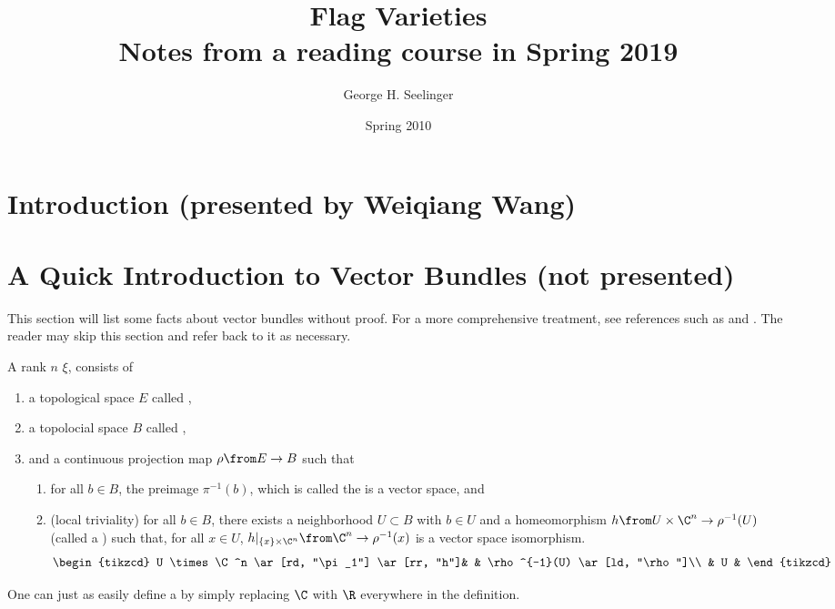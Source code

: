 \documentclass[11pt,leqno,oneside]{amsbook}
\title[Flag Varieties]{Flag Varieties \\ Notes
  from a reading course in Spring 2019}
\author{George H. Seelinger}
\date{Spring 2010}
\numberwithin{thm}{section}
\begin{document}
\maketitle
\section{Introduction (presented by Weiqiang Wang)}
\section{A Quick Introduction to Vector Bundles (not presented)}
This section will list some facts about vector bundles without
proof. For a more comprehensive treatment, see references such as
\cite{bott-tu} and \cite{milnor-stasheff}. The reader may skip this
section and refer back to it as necessary. 
\begin{defn}\label{defn-of-vector-bundle}
  A rank \(n\)  \(\xi\), consists of
  \begin{enumerate}
  \item a topological space \(E\) called ,
  \item a topolocial space \(B\) called ,
  \item and a continuous projection map \(\rho \from E \to B\) such that
    \begin{enumerate}
    \item for all \(b \in B\), the preimage \(\pi^{-1}(b)\), which is
      called the  is a vector space, and
    \item (local triviality) for all \(b \in B\), there exists a neighborhood \(U \subset
      B\) with \(b \in U\) and a homeomorphism \(h \from U \times \C^n
      \to \rho^{-1}(U)\) (called a ) such
      that, for all \(x \in U\), \(h|_{\{x\} 
        \times \C^n} \from \C^n \to \rho^{-1}(x)\) is a vector space
      isomorphism. \[
        \begin{tikzcd}
          U \times \C^n \ar[rd, "\pi_1"] \ar[rr, "h"]& & \rho^{-1}(U)
          \ar[ld, "\rho"]\\
          & U &
        \end{tikzcd}
      \]
    \end{enumerate}
  \end{enumerate}
\end{defn}
\begin{rmk}
  One can just as easily define a  by simply
  replacing \(\C\) with \(\R\) everywhere in the definition.
\end{rmk}
\end{document}
